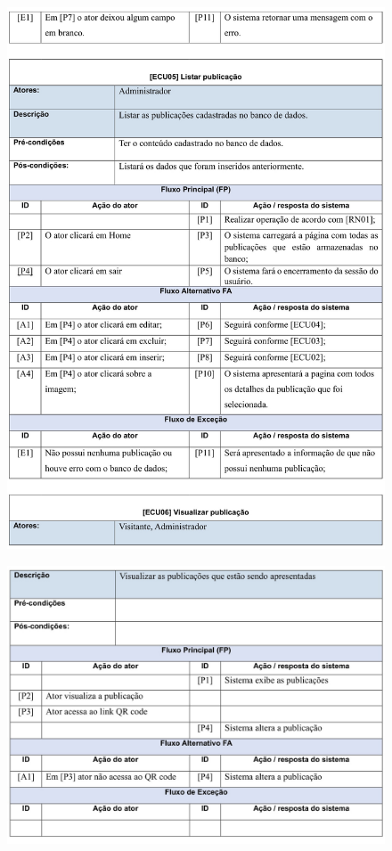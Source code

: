 \begin{figure}
    \includegraphics[width=\textwidth]{documentacao/ModeloArtefatos-09.jpg}
\end{figure}

\begin{figure}[H]
    \includegraphics[width=\textwidth]{documentacao/ModeloArtefatos-10.jpg}
\end{figure}

